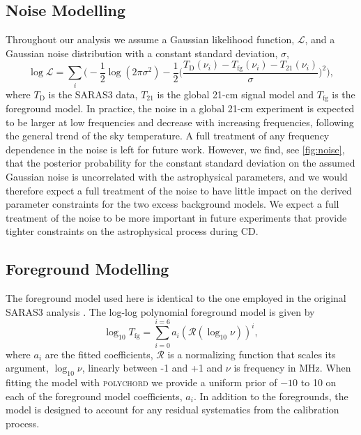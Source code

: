 \subsection{Noise Modelling}

Throughout our analysis we assume a Gaussian likelihood function, $\mathcal{L}$, and a Gaussian noise distribution with a constant standard deviation, $\sigma$,
\begin{equation}
    \log\mathcal{L} = \sum_i \bigg(-\frac{1}{2}\log(2\pi\sigma^2) -\frac{1}{2}\bigg(\frac{T_\mathrm{D}(\nu_i) - T_\mathrm{fg}(\nu_i) - T_\mathrm{21}(\nu_i)}{\sigma}\bigg)^2\bigg),
\end{equation}
where $T_\mathrm{D}$ is the SARAS3 data, $T_{21}$ is the global 21-cm signal model and $T_\mathrm{fg}$ is the foreground model. In practice, the noise in a global 21-cm experiment is expected to be larger at low frequencies and decrease with increasing frequencies, following the general trend of the sky temperature. A full treatment of any frequency dependence in the noise is left for future work. However, we find, see \cref{fig:noise}, that the posterior probability for the constant standard deviation on the assumed Gaussian noise is uncorrelated with the astrophysical parameters, and we would therefore expect a full treatment of the noise to have little impact on the derived parameter constraints for the two excess background models. We expect a full treatment of the noise to be more important in future experiments that provide tighter constraints on the astrophysical process during CD.


\subsection{Foreground Modelling}
The foreground model used here is identical to the one employed in the original SARAS3 analysis \cite{SARAS3}.  The log-log polynomial foreground model is given by
\begin{equation}
    \log_{10}T_\mathrm{fg} = \sum_{i=0}^{i=6}a_i\left(\mathcal{R}(\log_{10}\nu)\right)^i,
\end{equation}
where $a_i$ are the fitted coefficients, $\mathcal{R}$ is a normalizing function that scales its argument, $\log_{10}\nu$, linearly between -1 and +1 and $\nu$ is frequency in MHz. When fitting the model with \textsc{polychord} we provide a uniform prior of $-10$ to 10 on each of the foreground model coefficients, $a_i$. In addition to the foregrounds, the model is designed to account for any residual systematics from the calibration process.


